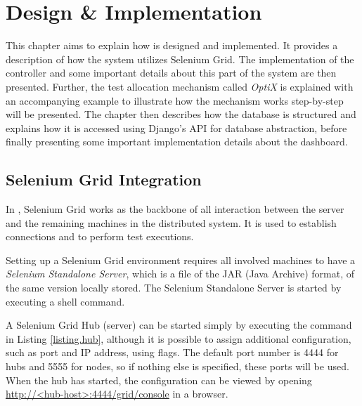 \section{Design \& Implementation}\label{chapter.implementation}
\thispagestyle{plain}


This chapter aims to explain how \toolname \space is designed and implemented.  It  provides a description of how the system utilizes Selenium Grid. The implementation of the controller and some important details about this part of the system are then presented. Further, the test allocation mechanism called \emph{OptiX} is explained with an accompanying example to illustrate how the mechanism works step-by-step will be presented. The chapter then describes how the database is structured and explains how it is accessed using Django's API for database abstraction, before finally presenting some important implementation details about the dashboard.




\subsection{Selenium Grid Integration}\label{section.selenium}

In \toolname, Selenium Grid works as the backbone of all interaction between the server and the remaining machines in the distributed system. It is used to establish connections and to perform test executions.

Setting up a Selenium Grid environment requires all involved machines to have a \emph{Selenium Standalone Server}, which is a file of the JAR (Java Archive) format, of the same version locally stored. The Selenium Standalone Server is started by executing a shell command.

A Selenium Grid Hub (server) can be started simply by executing the command in Listing \ref{listing.hub}, although it is possible to assign additional configuration, such as port and IP address, using flags. The default port number is 4444 for hubs and 5555 for nodes, so if nothing else is specified, these ports will be used. When the hub has started, the configuration can be viewed by opening \url{http://<hub-host>:4444/grid/console} in a browser.


